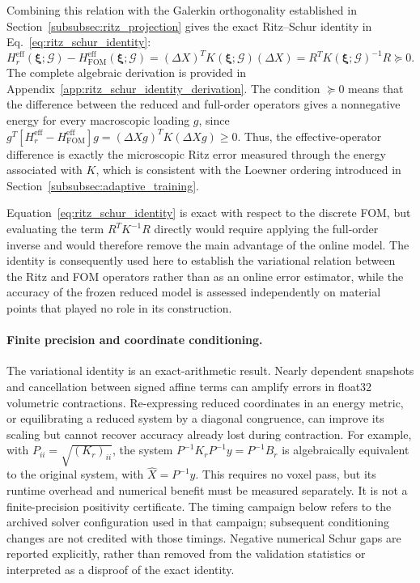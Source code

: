 \documentclass[pdflatex,sn-basic,Numbered]{sn-jnl}
\newcommand{\G}{\mathcal{G}}
\newcommand{\Hr}{H^{\mathrm{eff}}_r}
\newcommand{\Hfom}{H^{\mathrm{eff}}_{\mathrm{FOM}}}
\begin{document}
Combining this relation with the Galerkin orthogonality established in
Section~\ref{subsubsec:ritz_projection} gives the exact Ritz--Schur identity
in Eq.~\eqref{eq:ritz_schur_identity}:
\begin{equation}
\label{eq:ritz_schur_identity}
\Hr(\boldsymbol\xi;\G)
-
\Hfom(\boldsymbol\xi;\G)
=
(\Delta X)^T
K(\boldsymbol\xi;\G)
(\Delta X)
=
R^T
K(\boldsymbol\xi;\G)^{-1}
R
\succeq0.
\end{equation}
The complete algebraic derivation is provided in
Appendix~\ref{app:ritz_schur_identity_derivation}. The condition
\(\succeq0\) means that the difference between the reduced and full-order
operators gives a nonnegative energy for every macroscopic loading \(g\),
since
\(g^T[\Hr-\Hfom]g
=(\Delta Xg)^TK(\Delta Xg)\geq0\). Thus, the effective-operator difference is
exactly the microscopic Ritz error measured through the energy associated
with \(K\), which is consistent with the Loewner ordering introduced in
Section~\ref{subsubsec:adaptive_training}.

Equation~\eqref{eq:ritz_schur_identity} is exact with respect to the discrete
FOM, but evaluating the term \(R^TK^{-1}R\) directly would require applying
the full-order inverse and would therefore remove the main advantage of the
online model. The identity is consequently used here to establish the
variational relation between the Ritz and FOM operators rather than as an
online error estimator, while the accuracy of the frozen reduced model is
assessed independently on material points that played no role in its
construction.

\paragraph{Finite precision and coordinate conditioning.}
The variational identity is an exact-arithmetic result. Nearly dependent
snapshots and cancellation between signed affine terms can amplify errors in
float32 volumetric contractions. Re-expressing reduced coordinates in an
energy metric, or equilibrating a reduced system by a diagonal congruence,
can improve its scaling but cannot recover accuracy already lost during
contraction. For example, with \(P_{ii}=\sqrt{(K_r)_{ii}}\), the system
\(P^{-1}K_rP^{-1}y=P^{-1}B_r\) is algebraically equivalent to the original
system, with \(\widehat X=P^{-1}y\). This requires no voxel pass, but its
runtime overhead and numerical benefit must be measured separately. It is
not a finite-precision positivity certificate. The timing campaign below
refers to the archived solver configuration used in that campaign; subsequent
conditioning changes are not credited with those timings. Negative numerical
Schur gaps are reported explicitly, rather than removed from the validation
statistics or interpreted as a disproof of the exact identity.
\end{document}
